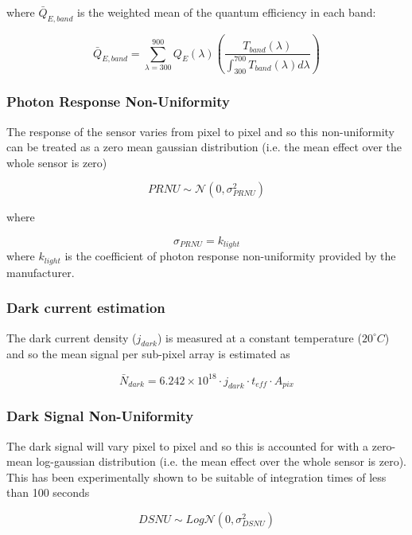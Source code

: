 \documentclass[10pt,a4paper,final,onecolumn]{article}
\begin{document}
where $\bar{Q}_{E,band}$ is the weighted mean of the quantum efficiency in each band:

\begin{equation}
\bar{Q}_{E, band} = \sum_{\lambda=300}^{900} Q_{E}(\lambda) \left(\frac{T_{band}(\lambda)}{\int_{300}^{700} T_{band}(\lambda) d\lambda}\right)
\end{equation}

\subsubsection{Photon Response Non-Uniformity}
The response of the sensor varies from pixel to pixel and so this non-uniformity can be treated as a zero mean gaussian distribution (i.e. the mean effect over the whole sensor is zero)

\begin{equation}
PRNU \sim \mathcal{N}(0, \sigma_{PRNU}^{2})
\end{equation}

where

\begin{equation}
\sigma_{PRNU} = k_{light}
\end{equation}
 where $k_{light}$ is the coefficient of photon response non-uniformity provided by the manufacturer.
 
\subsubsection{Dark current estimation}
The dark current density ($j_{dark}$) is measured at a constant temperature ($20^{\circ} C$) and so the mean signal per sub-pixel array is estimated as

\begin{equation}
\bar{N}_{dark} = 6.242 \times 10^{18} \cdot j_{dark} \cdot t_{eff} \cdot A_{pix}
\end{equation}

\subsubsection{Dark Signal Non-Uniformity}
The dark signal will vary pixel to pixel and so this is accounted for with a zero-mean log-gaussian distribution (i.e. the mean effect over the whole sensor is zero). This has been experimentally shown to be suitable of integration times of less than 100 seconds

\begin{equation}
DSNU \sim Log\mathcal{N}(0, \sigma_{DSNU}^{2})
\end{equation}
\end{document}

